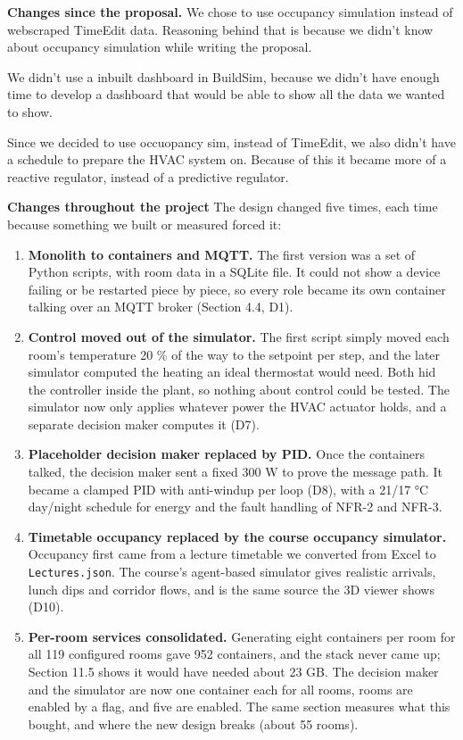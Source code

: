 \documentclass[11pt]{article}
\makeatletter
\providecommand{\tightlist}{\setlength{\itemsep}{0pt}\setlength{\parskip}{0pt}}
\DeclareRobustCommand{\_}{\ifmmode\nfss@text{\textunderscore}\else\textunderscore\allowbreak\fi}
\newcommand{\file}[1]{\texttt{#1}}
\makeatother
\begin{document}
\textbf{Changes since the proposal.} We chose to use occupancy simulation instead of webscraped TimeEdit data. 
Reasoning behind that is because we didn't know about occupancy simulation while writing the proposal.

We didn't use a inbuilt dashboard in BuildSim, because we didn't have enough time to develop a dashboard 
that would be able to show all the data we wanted to show.

Since we decided to use occuopancy sim, instead of TimeEdit, we also didn't have a schedule to prepare the HVAC system on.
Because of this it became more of a reactive regulator, instead of a predictive regulator.

\textbf{Changes throughout the project} The design changed five times, each time
because something we built or measured forced it:

\begin{enumerate}
\tightlist
\item \textbf{Monolith to containers and MQTT.} The first version was a set of
  Python scripts, with room data in a SQLite file. It could not show a device
  failing or be restarted piece by piece, so every role became its own container
  talking over an MQTT broker (Section 4.4, D1).
\item \textbf{Control moved out of the simulator.} The first script simply moved
  each room's temperature 20 \% of the way to the setpoint per step, and the later
  simulator computed the heating an ideal thermostat would need. Both hid the
  controller inside the plant, so nothing about control could be tested. The
  simulator now only applies whatever power the HVAC actuator holds, and a separate
  decision maker computes it (D7).
\item \textbf{Placeholder decision maker replaced by PID.} Once the containers
  talked, the decision maker sent a fixed 300 W to prove the message path. It
  became a clamped PID with anti-windup per loop (D8), with a 21/17 °C day/night
  schedule for energy and the fault handling of NFR-2 and NFR-3.
\item \textbf{Timetable occupancy replaced by the course occupancy simulator.}
  Occupancy first came from a lecture timetable we converted from Excel to
  \file{Lectures.json}. The course's agent-based simulator gives realistic arrivals,
  lunch dips and corridor flows, and is the same source the 3D viewer shows (D10).
\item \textbf{Per-room services consolidated.} Generating eight containers per
  room for all 119 configured rooms gave 952 containers, and the stack never came
  up; Section 11.5 shows it would have needed about 23 GB. The decision maker and
  the simulator are now one container each for all rooms, rooms are enabled by a
  flag, and five are enabled. The same section measures what this bought, and
  where the new design breaks (about 55 rooms).
\end{enumerate}
\end{document}
